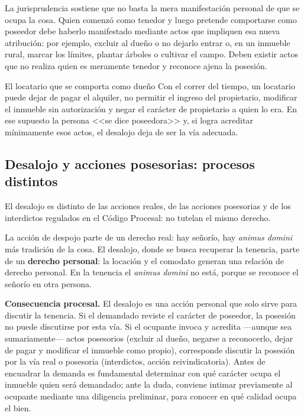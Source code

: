 \documentclass[12pt,oneside]{book}
\begin{document}
\begin{note}
La jurisprudencia sostiene que no basta la mera manifestación personal de que se ocupa la cosa. Quien comenzó como tenedor y luego pretende comportarse como poseedor debe haberlo manifestado mediante actos que impliquen esa nueva atribución: por ejemplo, excluir al dueño o no dejarlo entrar o, en un inmueble rural, marcar los límites, plantar árboles o cultivar el campo. Deben existir actos que no realiza quien es meramente tenedor y reconoce ajena la posesión.
\end{note}

\begin{example}{El locatario que se comporta como dueño}
Con el correr del tiempo, un locatario puede dejar de pagar el alquiler, no permitir el ingreso del propietario, modificar el inmueble sin autorización y negar el carácter de propietario a quien lo era. En ese supuesto la persona <<se dice poseedora>> y, si logra acreditar mínimamente esos actos, el desalojo deja de ser la vía adecuada.
\end{example}

\subsection{Desalojo y acciones posesorias: procesos distintos}

El desalojo es distinto de las acciones reales, de las acciones posesorias y de los interdictos regulados en el Código Procesal: no tutelan el mismo derecho.

\begin{important}
La acción de despojo parte de un derecho real: hay señorío, hay \textit{animus domini} más tradición de la cosa. El desalojo, donde se busca recuperar la tenencia, parte de un \textbf{derecho personal}: la locación y el comodato generan una relación de derecho personal. En la tenencia el \textit{animus domini} no está, porque se reconoce el señorío en otra persona.
\end{important}

\textbf{Consecuencia procesal.} El desalojo es una acción personal que solo sirve para discutir la tenencia. Si el demandado reviste el carácter de poseedor, la posesión no puede discutirse por esta vía. Si el ocupante invoca y acredita ---aunque sea sumariamente--- actos posesorios (excluir al dueño, negarse a reconocerlo, dejar de pagar y modificar el inmueble como propio), corresponde discutir la posesión por la vía real o posesoria (interdictos, acción reivindicatoria). Antes de encuadrar la demanda es fundamental determinar con qué carácter ocupa el inmueble quien será demandado; ante la duda, conviene intimar previamente al ocupante mediante una diligencia preliminar, para conocer en qué calidad ocupa el bien.
\end{document}
